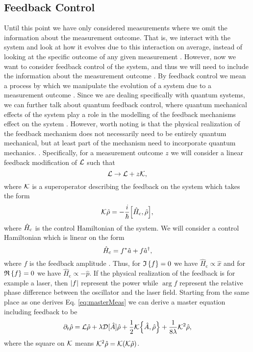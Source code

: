 \subsection{Feedback Control} \label{sec:feedback}
Until this point we have only considered measurements where we omit the information about the measurement outcome. That is, we interact with the system and look at how it evolves due to this interaction on average, instead of looking at the specific outcome of any given measurement \cite{Annby-Andersson:2024}. However, now we want to consider feedback control of the system, and thus we will need to include the information about the measurement outcome \cite{Annby-Andersson:2024}. By feedback control we mean a process by which we manipulate the evolution of a system due to a measurement outcome \cite{Wiseman:2009}. Since we are dealing specifically with quantum systems, we can further talk about quantum feedback control, where quantum mechanical effects of the system play a role in the modelling of the feedback mechanisms effect on the system \cite{Wiseman:2009}. However, worth noting is that the physical realization of the feedback mechanism does not necessarily need to be entirely quantum mechanical, but at least part of the mechanism need to incorporate quantum mechanics. \cite{Wiseman:2009}. Specifically, for a measurement outcome $z$ we will consider a linear feedback modification of $\mathcal{L}$ such that 
\begin{equation}
    \mathcal{L} \to \mathcal{L} + z \mathcal{K},
\end{equation}  
where $\mathcal{K}$ is a superoperator describing the feedback on the system \cite{Annby-Andersson:2024} which takes the form
\begin{equation}
    \feedback\dmatrix = - \frac{i}{\hbar} \comm{\hamiltonian_\mathrm{c}}{\dmatrix},
\end{equation}
where $\hat{H}_\mathrm{c}$ is the control Hamiltonian of the system. We will consider a control Hamiltonian which is linear on the form
\begin{equation}
    \hat{H}_\mathrm{c} = f^* \hat{a} + f \hat{a}^{\dagger},
\end{equation}
where $f$ is the feedback amplitude \cite{Wiseman:2009}. Thus, for $\mathfrak{I}\left\{f\right\} = 0$ we have $\hat{H}_\text{c} \propto \hat{x}$ and for $\mathfrak{R}\left\{f\right\} = 0$ we have $\hat{H}_\text{c} \propto -\hat{p}$. If the physical realization of the feedback is for example a laser, then $\abs{f}$ represent the power while $\arg{f}$ represent the relative phase difference between the oscillator and the laser field. Starting from the same place as one derives Eq. \eqref{eq:masterMeas} we can derive a master equation including feedback \cite{Annby-Andersson:2024} to be
\begin{equation}
    \dt\dmatrix = \liouvillian\dmatrix + \lambda \super{\hat{A}} \dmatrix + \frac{1}{2} \feedback \acomm{\hat{A}}{\dmatrix} + \frac{1}{8\lambda} \feedback^2 \dmatrix, \label{eq:masterFeed}
\end{equation}
where the square on $\mathcal{K}$ means $ \mathcal{K}^2 \hat{\rho} = \mathcal{K} ( \mathcal{K} \hat{\rho})$.
